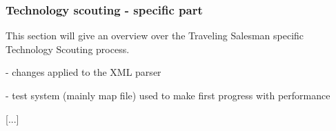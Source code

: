 \subsubsection{Technology scouting - specific part}
\label{sec:techscout_routing_specific}

This section will give an overview over the Traveling Salesman specific Technology Scouting process.\newline

- changes applied to the XML parser

- test system (mainly map file) used to make first progress with performance

[...]
